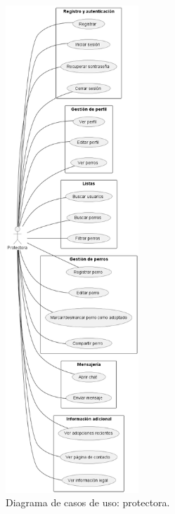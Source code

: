 \documentclass[a4paper, 12pt]{article}
\begin{document}
\begin{figure}[H]
	\begin{center}
		{\includegraphics[width=5cm]{diagram/Shelter.png}\par}
		\caption{Diagrama de casos de uso: protectora.}
	\end{center}
\end{figure}
\end{document}
